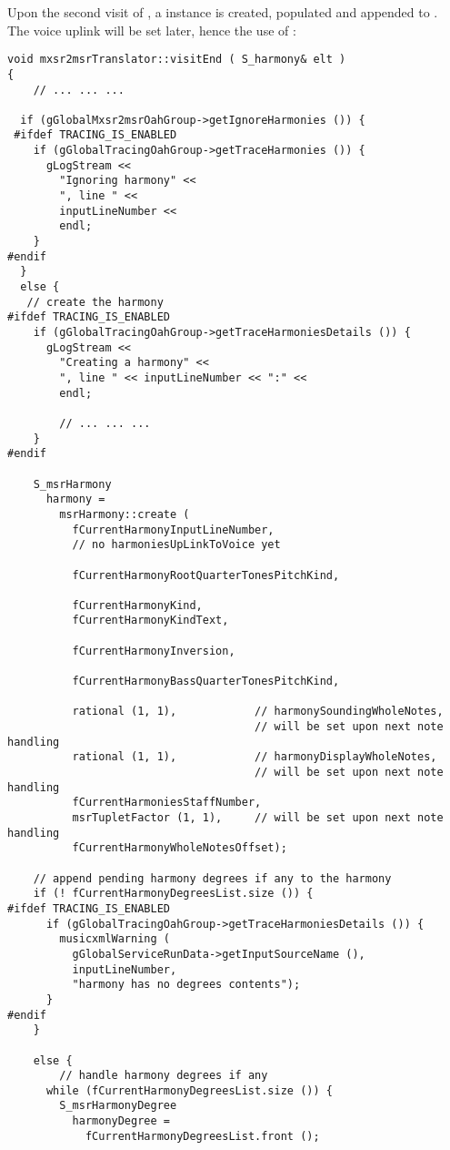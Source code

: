 Upon the second visit of , a  instance is created, populated and appended to .\\
The voice uplink will be set later, hence the use of :
\begin{lstlisting}[language=CPlusPlus]
void mxsr2msrTranslator::visitEnd ( S_harmony& elt )
{
	// ... ... ...

  if (gGlobalMxsr2msrOahGroup->getIgnoreHarmonies ()) {
 #ifdef TRACING_IS_ENABLED
    if (gGlobalTracingOahGroup->getTraceHarmonies ()) {
      gLogStream <<
        "Ignoring harmony" <<
        ", line " <<
        inputLineNumber <<
        endl;
    }
#endif
  }
  else {
   // create the harmony
#ifdef TRACING_IS_ENABLED
    if (gGlobalTracingOahGroup->getTraceHarmoniesDetails ()) {
      gLogStream <<
        "Creating a harmony" <<
        ", line " << inputLineNumber << ":" <<
        endl;

    	// ... ... ...
    }
#endif

    S_msrHarmony
      harmony =
        msrHarmony::create (
          fCurrentHarmonyInputLineNumber,
          // no harmoniesUpLinkToVoice yet

          fCurrentHarmonyRootQuarterTonesPitchKind,

          fCurrentHarmonyKind,
          fCurrentHarmonyKindText,

          fCurrentHarmonyInversion,

          fCurrentHarmonyBassQuarterTonesPitchKind,

          rational (1, 1),            // harmonySoundingWholeNotes,
                                      // will be set upon next note handling
          rational (1, 1),            // harmonyDisplayWholeNotes,
                                      // will be set upon next note handling
          fCurrentHarmoniesStaffNumber,
          msrTupletFactor (1, 1),     // will be set upon next note handling
          fCurrentHarmonyWholeNotesOffset);

    // append pending harmony degrees if any to the harmony
    if (! fCurrentHarmonyDegreesList.size ()) {
#ifdef TRACING_IS_ENABLED
      if (gGlobalTracingOahGroup->getTraceHarmoniesDetails ()) {
        musicxmlWarning (
          gGlobalServiceRunData->getInputSourceName (),
          inputLineNumber,
          "harmony has no degrees contents");
      }
#endif
    }

    else {
    	// handle harmony degrees if any
      while (fCurrentHarmonyDegreesList.size ()) {
        S_msrHarmonyDegree
          harmonyDegree =
            fCurrentHarmonyDegreesList.front ();


\end{lstlisting}
